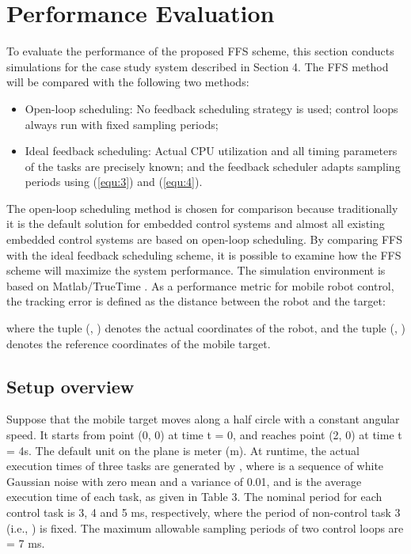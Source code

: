 \documentclass[12pt,a4paper]{ijicic}
\begin{document}
\section{Performance Evaluation}
\label{sec:5}

To evaluate the performance of the proposed FFS scheme,
this section conducts simulations for the case study system described in Section 4.
The FFS method will be compared with the following two methods:
\begin{itemize}
\item Open-loop scheduling: No feedback scheduling strategy is used; control loops
always run with fixed sampling periods;
\item Ideal feedback scheduling: Actual CPU utilization and all timing
parameters of the tasks are precisely known; and the feedback scheduler
adapts sampling periods using (\ref{equ:3}) and (\ref{equ:4}).
\end{itemize}

The open-loop scheduling method is chosen for comparison because traditionally
it is the default solution for embedded control systems and almost all existing
embedded control systems are based on open-loop scheduling. By comparing FFS with
the ideal feedback scheduling scheme, it is possible to examine how the FFS scheme
will maximize the system performance. The simulation environment is based on
Matlab/TrueTime \cite{R21}. As a performance metric for mobile robot control, the tracking
error is defined as the distance between the robot and the target:

where the tuple (, ) denotes the actual coordinates of the robot, and the tuple (, ) denotes the reference coordinates of the mobile target.

\subsection{Setup overview}
Suppose that the mobile target moves along a half circle with a constant angular
speed. It starts from point (0, 0) at time t = 0, and reaches point (2, 0) at time
t = 4s. The default unit on the plane is meter (m). At runtime,
the actual execution times of three tasks are generated by ,
where  is a sequence of white Gaussian noise with zero mean and a
variance of 0.01, and  is the average execution time of each task, as given
in Table 3. The nominal period for each control task is 3, 4 and 5 ms, respectively,
where the period of non-control task 3 (i.e., ) is fixed. The maximum
allowable sampling periods of two control loops are  = 7 ms.
\end{document}
